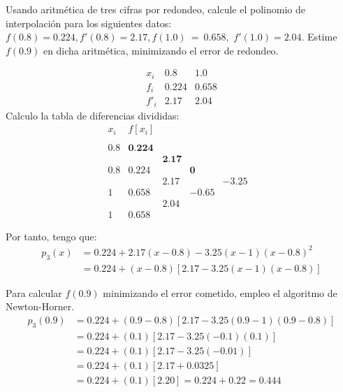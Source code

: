\begin{ejercicio}
    Usando aritmética de tres cifras por redondeo, calcule el polinomio de interpolación para los siguientes datos: $f(0.8) = 0.224, f'(0.8) = 2.17, f(1.0)~=~0.658,$ $f'(1.0) = 2.04$. Estime $f(0.9)$ en dicha aritmética, minimizando el error de redondeo.

    \begin{equation*}
        \begin{array}{c|cc}
            x_i & 0.8 & 1.0 \\ \hline
            f_i & 0.224 & 0.658 \\ \hline
            f'_i & 2.17 & 2.04
        \end{array}
    \end{equation*}
    Calculo la tabla de diferencias divididas:
    \begin{equation*}
        \begin{array}{c|cccccc}
            x_i & f[x_i] \\
            \\
            0.8 & \textbf{0.224} \\
            && \textbf{2.17}\\
            0.8 & 0.224 && \textbf{0}\\
            && 2.17&&\mathbf{-3.25}\\
            1 & 0.658 && -0.65 &&\\
            && 2.04\\
            1 & 0.658
        \end{array}
    \end{equation*}

    Por tanto, tengo que:
    \begin{equation*}
        \begin{split}
            p_3(x)&= 0.224 + 2.17(x-0.8) -3.25(x-1)(x-0.8)^2 \\
            &= 0.224 +(x-0.8)[2.17-3.25(x-1)(x-0.8)]
        \end{split}
    \end{equation*}

    Para calcular $f(0.9)$ minimizando el error cometido, empleo el algoritmo de Newton-Horner.
    \begin{equation*}
        \begin{split}
            p_3(0.9)&= 0.224 +(0.9-0.8)[2.17-3.25(0.9-1)(0.9-0.8)] \\
            &= 0.224 +(0.1)[2.17-3.25(-0.1)(0.1)]\\
            &= 0.224 +(0.1)[2.17-3.25(-0.01)] \\
            &= 0.224 +(0.1)[2.17 +0.0325] \\
            &= 0.224 +(0.1)[2.20] = 0.224+0.22 = 0.444 \\
        \end{split}
    \end{equation*}
    
\end{ejercicio}


